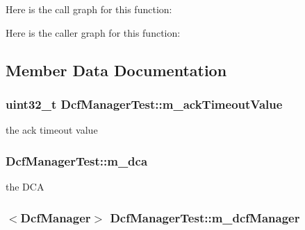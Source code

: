 Here is the call graph for this function\+:




Here is the caller graph for this function\+:




\subsection{Member Data Documentation}
\subsubsection[{\texorpdfstring{m\+\_\+ack\+Timeout\+Value}{m_ackTimeoutValue}}]{\setlength{\rightskip}{0pt plus 5cm}uint32\+\_\+t Dcf\+Manager\+Test\+::m\+\_\+ack\+Timeout\+Value\hspace{0.3cm}{\ttfamily [private]}}\hypertarget{classDcfManagerTest_afbe6fd38a77863c1b0ecad897100da85}{}\label{classDcfManagerTest_afbe6fd38a77863c1b0ecad897100da85}


the ack timeout value 

\subsubsection[{\texorpdfstring{m\+\_\+dca}{m_dca}}]{ Dcf\+Manager\+Test\+::m\+\_\+dca\hspace{0.3cm}{\ttfamily [private]}}\hypertarget{classDcfManagerTest_a9714d9806894e7d3e31172609f3f32b2}{}\label{classDcfManagerTest_a9714d9806894e7d3e31172609f3f32b2}


the D\+CA 

\subsubsection[{\texorpdfstring{m\+\_\+dcf\+Manager}{m_dcfManager}}]{$<${\bf Dcf\+Manager}$>$ Dcf\+Manager\+Test\+::m\+\_\+dcf\+Manager\hspace{0.3cm}{\ttfamily [private]}}\hypertarget{classDcfManagerTest_ac21f6faaf950603dcb1e681cf0e35626}{}\label{classDcfManagerTest_ac21f6faaf950603dcb1e681cf0e35626}


